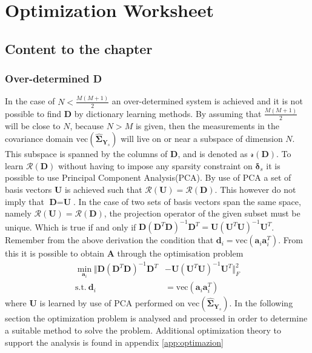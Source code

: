 \chapter*{Optimization Worksheet}
\section{Content to the chapter}
\subsection{Over-determined \textbf{D}}
In the case of $N < \frac{M(M+1)}{2}$ an over-determined system is achieved and it is not possible to find $\textbf{D}$ by dictionary learning methods.
By assuming that $\frac{M(M+1)}{2}$ will be close to $N$, because $N > M$ is given, then the measurements in the covariance domain $\text{vec}(\widehat{\boldsymbol{\Sigma}}_{\textbf{Y}_s})$ will live on or near a subspace of dimension $N$. 
This subspace is spanned by the columns of $\textbf{D}$, and is denoted as $\mathcal{r}(\textbf{D})$. 
To learn $\mathcal{R}(\textbf{D})$ without having to impose any sparsity constraint on $\boldsymbol{\delta}_s$ it is possible to use Principal Component Analysis(PCA). 
By use of PCA a set of basis vectors $\textbf{U}$ is achieved such that $\mathcal{R}(\textbf{U})=\mathcal{R}(\textbf{D})$. 
This however do not imply that $\textbf{D}=\textbf{U}$. 
In the case of two sets of basis vectors span the same space, namely $\mathcal{R}(\textbf{U})=\mathcal{R}(\textbf{D})$, the projection operator of the given subset must be unique. 
Which is true if and only if $\textbf{D}(\textbf{D}^T\textbf{D})^{-1}\textbf{D}^T=\textbf{U}(\textbf{U}^T\textbf{U})^{-1}\textbf{U}^T$. 
Remember from the above derivation the condition that $\textbf{d}_i = \text{vec}(\textbf{a}_i\textbf{a}_i^T)$. 
From this it is possible to obtain $\textbf{A}$ through the optimisation problem 
\begin{align}
\min_{\textbf{a}_i}\Vert  \textbf{D}(\textbf{D}^T\textbf{D})^{-1}\textbf{D}^T &- \textbf{U}(\textbf{U}^T\textbf{U})^{-1}\textbf{U}^T \Vert_{F}^{2} \nonumber \\
\text{s.t.} \ \textbf{d}_i&=\text{vec}(\textbf{a}_i\textbf{a}_i^T)\label{eq:Cov_DL2}
\end{align}      
where $\textbf{U}$ is learned by use of PCA performed on $\text{vec}(\widehat{\boldsymbol{\Sigma}}_{\textbf{Y}_s})$.
In the following section the optimization problem is analysed and processed in order to determine a suitable method to solve the problem. Additional optimization theory to support the analysis is found in appendix \ref{app:optimazion}  

